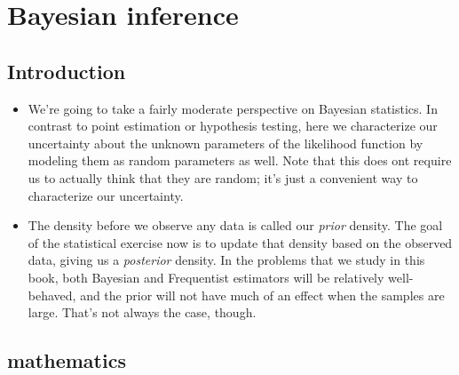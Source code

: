 

\chapter{Bayesian inference}

\section{Introduction}

\begin{itemize}[leftmargin=0pt]

\item We're going to take a fairly moderate perspective on Bayesian
  statistics.  In contrast to point estimation or hypothesis testing,
  here we characterize our uncertainty about the unknown parameters of
  the likelihood function by modeling them as random parameters as
  well.  Note that this does ont require us to actually think that
  they are random; it's just a convenient way to characterize our
  uncertainty.

\item The density before we observe any data is called our
  \emph{prior} density.  The goal of the statistical exercise now is
  to update that density based on the observed data, giving us a
  \emph{posterior} density.  In the problems that we study in this
  book, both Bayesian and Frequentist estimators will be relatively
  well-behaved, and the prior will not have much of an effect when the
  samples are large.  That's not always the case, though.

\end{itemize}

\section{mathematics}

